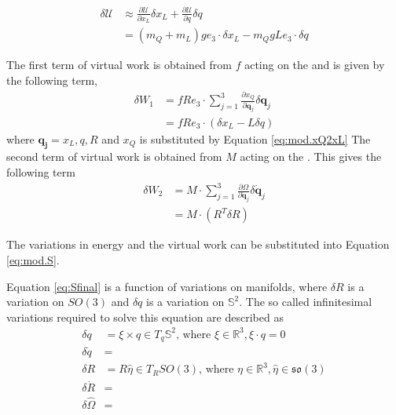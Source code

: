 \begin{equation}\label{key}
\begin{aligned}
\delta\mathcal{U}&\approx \frac{\partial \mathcal{U}}{\partial{x}_L} \delta{x}_L +\frac{\partial \mathcal{U}}{\partial{q}}\delta{q}\\
&=(m_Q+m_L)ge_3\cdot\delta x_L-m_QgLe_3\cdot\delta q
\end{aligned}
\end{equation}

The first term of virtual work is obtained from $ f $ acting on the  and is given by the following term,
\begin{equation}\label{key}
\begin{aligned}
\delta W_1&=fRe_3\cdot \sum_{j=1}^{3}\frac{\partial x_Q}{\partial \mathbf{q}_j}\delta \mathbf{q}_j\\
&=fRe_3\cdot(\delta x_L-L\delta q)
\end{aligned}
\end{equation}
where $ \mathbf{q_j}={x_L,q,R} $ and $ x_Q $ is substituted by Equation \ref{eq:mod.xQ2xL}
The second term of virtual work is obtained from $ M $ acting on the . This gives the following term
\begin{equation}\label{key}
\begin{aligned}
\delta W_2&=M\cdot \sum_{j=1}^{3}\frac{\partial\Omega}{\partial \mathbf{\dot{q}}_j}\delta \mathbf{\dot{q}}_j\\
&=M\cdot(R^T\delta R)
\end{aligned}\end{equation}

The variations in energy and the virtual work can be substituted into Equation \ref{eq:mod.S}.

Equation \ref{eq:Sfinal} is a function of variations on manifolds, where $ \delta R $ is a variation on $ SO(3) $ and $ \delta q $ is a variation on $ \mathbb{S}^2 $. 
The so called infinitesimal variations required to solve this equation are described as \cite{Bullo2005,Sreenath2013c}
\begin{equation}\label{key}
\begin{aligned}
\delta q&=\xi\times q \in T_q\mathbb{S}^2\text{, where }\xi\in\mathbb{R}^3,\xi\cdot q=0\\
\delta \dot{q}&=\\
\delta R&=R\hat{\eta}\in T_RSO(3)\text{, where } \eta\in\mathbb{R}^3,\hat{\eta}\in\mathfrak{so}(3)\\
\delta \dot{R}&=\\
\delta \hat{\Omega}&=\\
\end{aligned}
\end{equation}

